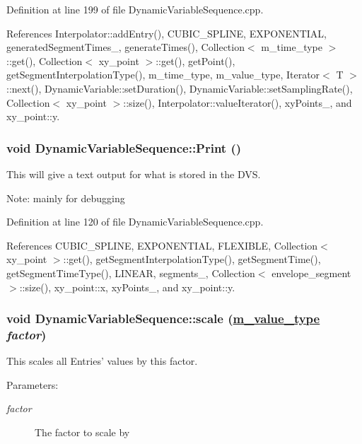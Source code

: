 Definition at line 199 of file Dynamic\-Variable\-Sequence.cpp.

References Interpolator::add\-Entry(), CUBIC\_\-SPLINE, EXPONENTIAL, generated\-Segment\-Times\_\-, generate\-Times(), Collection$<$ m\_\-time\_\-type $>$::get(), Collection$<$ xy\_\-point $>$::get(), get\-Point(), get\-Segment\-Interpolation\-Type(), m\_\-time\_\-type, m\_\-value\_\-type, Iterator$<$ T $>$::next(), Dynamic\-Variable::set\-Duration(), Dynamic\-Variable::set\-Sampling\-Rate(), Collection$<$ xy\_\-point $>$::size(), Interpolator::value\-Iterator(), xy\-Points\_\-, and xy\_\-point::y.\hypertarget{classDynamicVariableSequence_a6}{
\subsubsection[Print]{\setlength{\rightskip}{0pt plus 5cm}void Dynamic\-Variable\-Sequence::Print ()}}
\label{classDynamicVariableSequence_a6}


This will give a text output for what is stored in the DVS. \begin{Desc}
\item[Note:]mainly for debugging \end{Desc}


Definition at line 120 of file Dynamic\-Variable\-Sequence.cpp.

References CUBIC\_\-SPLINE, EXPONENTIAL, FLEXIBLE, Collection$<$ xy\_\-point $>$::get(), get\-Segment\-Interpolation\-Type(), get\-Segment\-Time(), get\-Segment\-Time\-Type(), LINEAR, segments\_\-, Collection$<$ envelope\_\-segment $>$::size(), xy\_\-point::x, xy\-Points\_\-, and xy\_\-point::y.\hypertarget{classDynamicVariableSequence_a25}{
\subsubsection[scale]{\setlength{\rightskip}{0pt plus 5cm}void Dynamic\-Variable\-Sequence::scale (\hyperlink{Types_8h_a3}{m\_\-value\_\-type} {\em factor})}}
\label{classDynamicVariableSequence_a25}


This scales all Entries' values by this factor. \begin{Desc}
\item[Parameters:]
\begin{description}
\item[{\em factor}]The factor to scale by \end{description}
\end{Desc}


